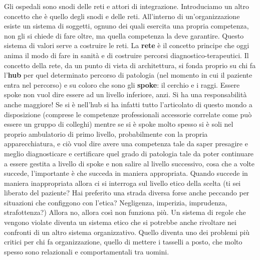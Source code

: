 Gli ospedali sono snodi delle reti e attori di integrazione.
Introduciamo un altro concetto che è quello degli snodi e delle reti.
All'interno di un'organizzazione esiste un sistema di soggetti, ognuno
dei quali esercita una propria competenza, non gli si chiede di fare
oltre, ma quella competenza la deve garantire. Questo sistema di valori
serve a costruire le reti. La \textbf{rete} è il concetto principe che
oggi anima il modo di fare in sanità e di costruire percorsi
diagnostico-terapeutici. Il concetto della rete, da un punto di vista di
architettura, si fonda proprio su chi fa l'\textbf{hub} per quel
determinato percorso di patologia (nel momento in cui il paziente entra
nel percorso) e su coloro che sono gli \textbf{spoke}: il cerchio e i
raggi. Essere spoke non vuol dire essere ad un livello inferiore, anzi.
Si ha una responsabilità anche maggiore! Se si è nell'hub si ha infatti
tutto l'articolato di questo mondo a disposizione (comprese le
competenze professionali accessorie correlate come può essere un gruppo
di colleghi) mentre se si è spoke molto spesso si è soli nel proprio
ambulatorio di primo livello, probabilmente con la propria
apparecchiatura, e ciò vuol dire avere una competenza tale da saper
presagire e meglio diagnosticare e certificare quel grado di patologia
tale da poter continuare a essere gestita a livello di spoke e non
salire al livello successivo, cosa che a volte succede, l'importante è
che succeda in maniera appropriata. Quando succede in maniera
inappropriata allora ci si interroga sul livello etico della scelta (ti
sei liberato del paziente? Hai preferito una strada diversa forse anche
peccando per situazioni che configgono con l'etica? Negligenza,
imperizia, imprudenza, strafottenza?) Allora no, allora così non
funziona più. Un sistema di regole che vengono violate diventa un
sistema etico che si potrebbe anche rivoltare nei confronti di un altro
sistema organizzativo. Quello diventa uno dei problemi più critici per
chi fa organizzazione, quello di mettere i tasselli a posto, che molto
spesso sono relazionali e comportamentali tra uomini.

